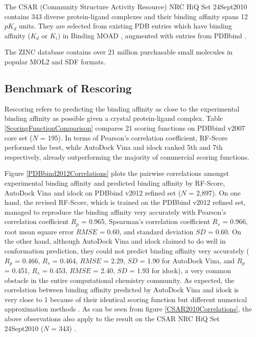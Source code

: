 \documentclass[10pt]{article}
\begin{document}
The CSAR (Community Structure Activity Resource) NRC HiQ Set 24Sept2010 contains 343 diverse protein-ligand complexes and their binding affinity spans 12 $pK_d$ units. They are selected from existing PDB \cite{540,537} entries which have binding affinity ($K_d$ or $K_i$) in Binding MOAD \cite{517,518}, augmented with entries from PDBbind \cite{529,530}.

The ZINC database contains over 21 million purchasable small molecules in popular MOL2 and SDF formats.

\subsection*{Benchmark of Rescoring}
Rescoring refers to predicting the binding affinity as close to the experimental binding affinity as possible given a crystal protein-ligand complex. Table \ref{ScoringFunctionComparison} compares 21 scoring functions on PDBbind v2007 core set ($N$ = 195). In terms of Pearson's correlation coefficient, RF-Score performed the best, while AutoDock Vina and idock ranked 5th and 7th respectively, already outperforming the majority of commercial scoring functions.

Figure \ref{PDBbind2012Correlations} plots the pairwise correlations amongst experimental binding affinity and predicted binding affinity by RF-Score, AutoDock Vina and idock on PDBbind v2012 \cite{529,530} refined set ($N$ = 2,897). On one hand, the revised RF-Score, which is trained on the PDBbind v2012 refined set, managed to reproduce the binding affinity very accurately with Pearson's correlation coefficient $R_p$ = 0.965, Spearman's correlation coefficient $R_s$ = 0.966, root mean square error $RMSE$ = 0.60, and standard deviation $SD$ = 0.60. On the other hand, although AutoDock Vina and idock claimed to do well in conformation prediction, they could not predict binding affinity very accurately ($R_p$ = 0.466, $R_s$ = 0.464, $RMSE$ = 2.29, $SD$ = 1.90 for AutoDock Vina, and $R_p$ = 0.451, $R_s$ = 0.453, $RMSE$ = 2.40, $SD$ = 1.93 for idock), a very common obstacle in the entire computational chemistry community. As expected, the correlation between binding affinity predicted by AutoDock Vina and idock is very close to 1 because of their identical scoring function but different numerical approximation methods \cite{1153}. As can be seen from figure \ref{CSAR2010Correlations}, the above observations also apply to the result on the CSAR NRC HiQ Set 24Sept2010 ($N$ = 343) \cite{857,960}.
\end{document}
